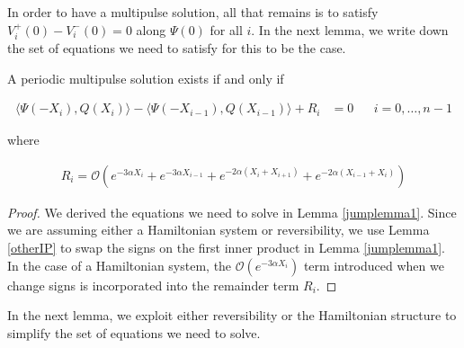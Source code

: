 \documentclass[thesis.tex]{subfiles}
\begin{document}
In order to have a multipulse solution, all that remains is to satisfy $V_i^+(0) - V_i^-(0) = 0$ along $\Psi(0)$ for all $i$. In the next lemma, we write down the set of equations we need to satisfy for this to be the case.

\begin{lemma}\label{IPsystem}
A periodic multipulse solution exists if and only if 

\begin{align}\label{jumpIPdiff}
\langle \Psi(-X_i), Q(X_i) \rangle - \langle \Psi(-X_{i-1}), Q(X_{i-1}) \rangle + R_i &= 0 && i = 0, \dots, n-1
\end{align}

where 

\begin{align*}
R_i = \mathcal{O} ( e^{-3 \alpha X_i} +  e^{-3 \alpha X_{i-1}}
+ e^{-2 \alpha (X_i + X_{i+1})} + e^{-2 \alpha (X_{i-1} + X_i)})
\end{align*}

\begin{proof}
We derived the equations we need to solve in Lemma \ref{jumplemma1}. Since we are assuming either a Hamiltonian system or reversibility, we use Lemma \ref{otherIP} to swap the signs on the first inner product in Lemma \ref{jumplemma1}. In the case of a Hamiltonian system, the $\mathcal{O}(e^{-3 \alpha X_i})$ term introduced when we change signs is incorporated into the remainder term $R_i$.
\end{proof}
\end{lemma}

In the next lemma, we exploit either reversibility or the Hamiltonian structure to simplify the set of equations we need to solve.
\end{document}
